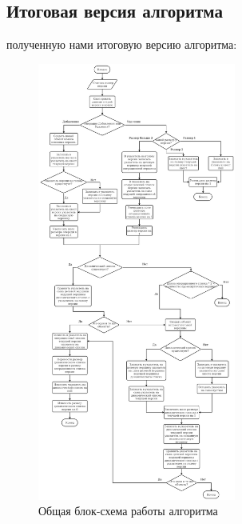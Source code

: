 \documentclass[a4paper,12pt]{extarticle}
\begin{document}
\subsection{Итоговая версия алгоритма}
 полученную нами итоговую версию алгоритма:
\begin{figure}[h!]
	\centering
	\includegraphics[width=0.58\textwidth]{content/Persistent queue algorithm flowchart.png}
	\caption{Общая блок-схема работы алгоритма}
	\label{block-scheme}
\end{figure}
\pagebreak
\end{document}
